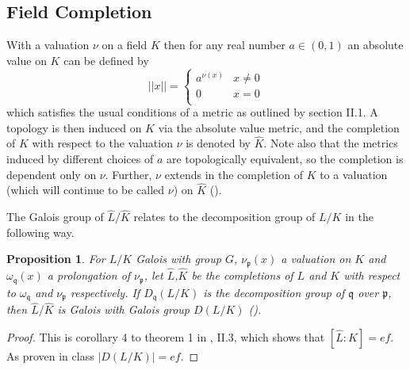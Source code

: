 \documentclass[paper=a4, fontsize=11pt]{scrartcl} %
\numberwithin{equation}{section} %
\numberwithin{figure}{section} %
\numberwithin{table}{section} %
\theoremstyle{break}
\newtheorem{prop}{Proposition}
\begin{document}
\subsection{Field Completion}
With a valuation $\nu$ on a field $K$ then for any real number $a\in(0,1)$ an absolute value on $K$ can be defined by
\[ ||x|| =  \begin{cases} 
      a^{\nu(x)} & x \not= 0 \\
      0 & x = 0 \\
   \end{cases}
\]
which satisfies the usual conditions of a metric as outlined by \cite{Serre} section II.1. A topology is then induced on $K$ via the absolute value metric, and the completion of $K$ with respect to the valuation $\nu$ is denoted by $\widehat{K}$. Note also that the metrics induced by different choices of $a$ are topologically equivalent, so the completion is dependent only on $\nu$. Further, $\nu$ extends in the completion of $K$ to a valuation (which will continue to be called $\nu$) on $\widehat{K}$ (\cite{Serre}).

The Galois group of $\widehat{L}/\widehat{K}$ relates to the decomposition group of $L/K$ in the following way.
\begin{prop}
For $L/K$ Galois with group $G$, $\nu_\mathfrak{p}(x)$ a valuation on $K$ and $\omega_\mathfrak{q}(x)$ a prolongation of $\nu_\mathfrak{p}$, let $\widehat{L}$,$\widehat{K}$ be the completions of $L$ and $K$ with respect to $\omega_\mathfrak{q}$ and $\nu_\mathfrak{p}$ respectively. If $D_{\mathfrak{q}}(L/K)$ is the decomposition group of $\mathfrak{q}$ over $\mathfrak{p}$, then $\widehat{L}/\widehat{K}$ is Galois with Galois group $D(L/K)$ (\cite{Serre}).
\end{prop}
\begin{proof}
This is corollary 4 to theorem 1 in \cite{Serre}, II.3, which shows that $[\widehat{L}:\widehat{K}]=ef$. As proven in class $|D(L/K)|=ef$.
\end{proof}
\end{document}
